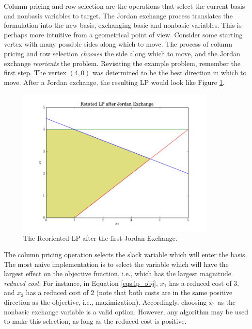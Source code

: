 Column pricing and row selection are the operations that select the current
basis and nonbasis variables to target. The Jordan exchange process translates
the formulation into the new basis, exchanging basic and nonbasic
variables. This is perhaps more intuitive from a geometrical point of
view. Consider some starting vertex with many possible sides along which to
move. The process of column pricing and row selection \textit{chooses} the side
along which to move, and the Jordan exchange \textit{reorients} the
problem. Revisiting the example problem, remember the first step. The vertex
$(4, 0)$ was determined to be the best direction in which to move. After a
Jordan exchange, the resulting LP would look like Figure \ref{fig:rotated}.

\begin{figure}[H]
  \begin{center}
    \includegraphics[height=7.5cm]{./chapters/litreview/plots/rotated.png}
  \caption{The Reoriented LP after the first Jordan Exchange.}
  \label{fig:rotated}
  \end{center}
\end{figure}

The column pricing operation selects the slack variable which will enter the
basis. The most naive implementation is to select the variable which will have
the largest effect on the objective function, i.e., which has the largest
magnitude \textit{reduced cost}. For instance, in Equation \ref{eqs:lp_obj},
$x_1$ has a reduced cost of 3, and $x_2$ has a reduced cost of 2 (note that both
costs are in the same positive direction as the objective, i.e.,
maximization). Accordingly, choosing $x_1$ as the nonbasic exchange variable is
a valid option. However, any algorithm may be used to make this selection, as
long as the reduced cost is positive.


